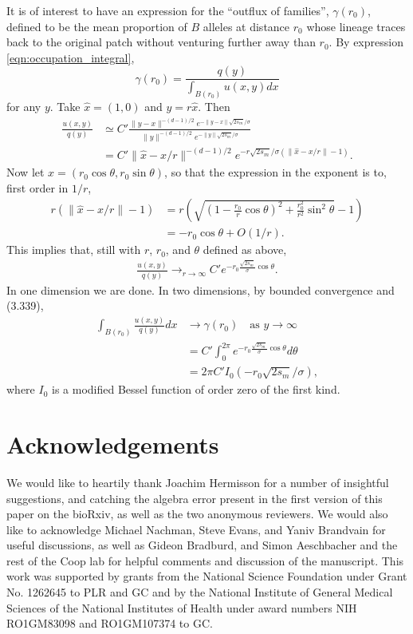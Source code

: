 \documentclass{article}
\newcommand{\citet}[1]{\cite{#1}}
\begin{document}
It is of interest to have an expression for the ``outflux of families'',
$\gamma(r_0)$, 
defined to be the mean proportion of $B$ alleles at distance $r_0$
whose lineage traces back to the original patch without venturing further away than $r_0$.
By expression \eqref{eqn:occupation_integral},
\[
    \gamma(r_0) = \frac{q(y)}{\int_{B(r_0)} u(x,y) dx}
\]
for any $y$.  
Take $\hat x = (1,0)$ and $y=r \hat x$.  Then
\begin{align}
  \frac{ u(x,y) }{ q(y) } &\simeq C' \frac{ \|y-x\|^{-(d-1)/2} e^{-\|y-x\| \sqrt{2s_m}/\sigma } }{ \|y\|^{-(d-1)/2} e^{-\|y\| \sqrt{2s_m}/\sigma } } \\
  &= C' \| \hat x - x/r \|^{-(d-1)/2} e^{-r \sqrt{2s_m}/\sigma  (\|\hat x - x/r\| - 1)} .
\end{align}
Now let $x = (r_0 \cos \theta, r_0 \sin \theta)$,
so that the expression in the exponent is to, first order in $1/r$,
\begin{align}
    r (\|\hat x - x/r\| - 1) &= r \left( \sqrt{ \left( 1 - \frac{r_0}{r} \cos \theta \right)^2 + \frac{r_0^2}{r^2} \sin^2 \theta } - 1 \right ) \\
            &= - r_0 \cos \theta + O(1/r) .
\end{align}
This implies that, still with $r$, $r_0$, and $\theta$ defined as above,
\begin{align}
  \frac{u(x,y)}{q(y)} \longrightarrow_{r \to \infty} C' e^{-r_0 \frac{\sqrt{2s_m}}{\sigma} \cos \theta} .
\end{align}
In one dimension we are done.
In two dimensions,
by bounded convergence and \citet{gradshteyn2007table} (3.339),
\begin{align}
  \int_{B(r_0)} \frac{u(x,y)}{q(y)} dx &\to \gamma(r_0) \quad \text{as } y \to \infty\\
  &= C' \int_0^{2 \pi} e^{-r_0 \frac{\sqrt{2s_m}}{\sigma} \cos \theta} d\theta \\
  &= 2 \pi C' I_0(-r_0\sqrt{2 s_m}/\sigma),
\end{align}
where $I_0$ is a modified Bessel function of order zero of the first kind.




\section*{Acknowledgements}
We would like to heartily thank Joachim Hermisson for a number of insightful suggestions,
and catching the algebra error present in the first version of this paper on the bioRxiv,
as well as the two anonymous reviewers.
We would also like to acknowledge Michael Nachman, Steve Evans, and Yaniv Brandvain for useful discussions, 
as well as Gideon Bradburd, and Simon Aeschbacher and the rest of the Coop lab
for helpful comments and discussion of the manuscript.
This work was supported by grants from the
National Science Foundation under Grant No. 1262645 to PLR and GC and by the
National Institute of General Medical Sciences of the National
Institutes of Health under award numbers NIH RO1GM83098 and
RO1GM107374 to GC.
\end{document}
